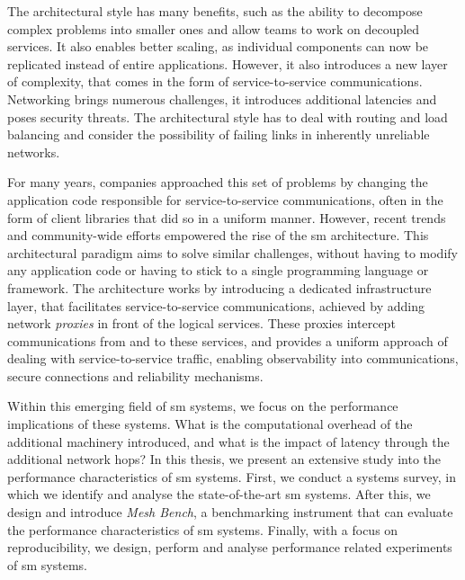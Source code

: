 The architectural style has many benefits, such as the ability to decompose complex problems into smaller ones and allow teams to work on decoupled services. It also enables better scaling, as individual components can now be replicated instead of entire applications. However, it also introduces a new layer of complexity, that comes in the form of service-to-service communications. Networking brings numerous challenges, it introduces additional latencies and poses security threats. The architectural style has to deal with routing and load balancing and consider the possibility of failing links in inherently unreliable networks.

For many years, companies approached this set of problems by changing the application code responsible for service-to-service communications, often in the form of client libraries that did so in a uniform manner. However, recent trends and community-wide efforts empowered the rise of the \gls{sm} architecture. This architectural paradigm aims to solve similar challenges, without having to modify any application code or having to stick to a single programming language or framework. The architecture works by introducing a dedicated infrastructure layer, that facilitates service-to-service communications, achieved by adding network \textit{proxies} in front of the logical services. These proxies intercept communications from and to these services, and provides a uniform approach of dealing with service-to-service traffic, enabling observability into communications, secure connections and reliability mechanisms. 


Within this emerging field of \gls{sm} systems, we focus on the performance implications of these systems. What is the computational overhead of the additional machinery introduced, and what is the impact of latency through the additional network hops? In this thesis, we present an extensive study into the performance characteristics of \gls{sm} systems. First, we conduct a systems survey, in which we identify and analyse the state-of-the-art \gls{sm} systems. After this, we design and introduce \textit{Mesh Bench}, a benchmarking instrument that can evaluate the performance characteristics of \gls{sm} systems. Finally, with a focus on reproducibility, we design, perform and analyse  performance related experiments of \gls{sm} systems.








